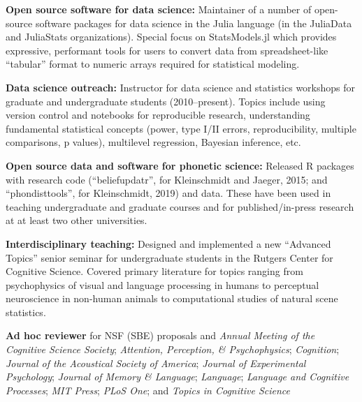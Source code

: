 \documentclass[11pt]{article}
\begin{document}
\textbf{Open source software for data science:} Maintainer of a number of
open-source software packages for data science in the Julia language (in the
JuliaData and JuliaStats organizations).  Special focus on StatsModels.jl which
provides expressive, performant tools for users to convert data from
spreadsheet-like ``tabular'' format to numeric arrays required for statistical
modeling.

\textbf{Data science outreach:} Instructor for data science and statistics
workshops for graduate and undergraduate students (2010--present).  Topics
include using version control and notebooks for reproducible research,
understanding fundamental statistical concepts (power, type I/II errors,
reproducibility, multiple comparisons, p values), multilevel regression,
Bayesian inference, etc.

\textbf{Open source data and software for phonetic science:} Released R packages
with research code (``beliefupdatr'', for Kleinschmidt and Jaeger, 2015;
and ``phondisttools'', for Kleinschmidt, 2019) and data.  These have been
used in teaching undergraduate and graduate courses and for published/in-press
research at at least two other universities.

\textbf{Interdisciplinary teaching:} Designed and implemented a new ``Advanced
Topics'' senior seminar for undergraduate students in the Rutgers Center for
Cognitive Science.  Covered primary literature for topics ranging from
psychophysics of visual and language processing in humans to perceptual
neuroscience in non-human animals to computational studies of natural scene
statistics.

\textbf{Ad hoc reviewer} for NSF (SBE) proposals and
  \emph{Annual Meeting of the Cognitive Science Society};
  \emph{Attention, Perception, \& Psychophysics};
  \emph{Cognition};
  \emph{Journal of the Acoustical Society of America};
  \emph{Journal of Experimental Psychology};
  \emph{Journal of Memory \& Language};
  \emph{Language};
  \emph{Language and Cognitive Processes};
  \emph{MIT Press};
  \emph{PLoS One}; and
  \emph{Topics in Cognitive Science}
\end{document}
